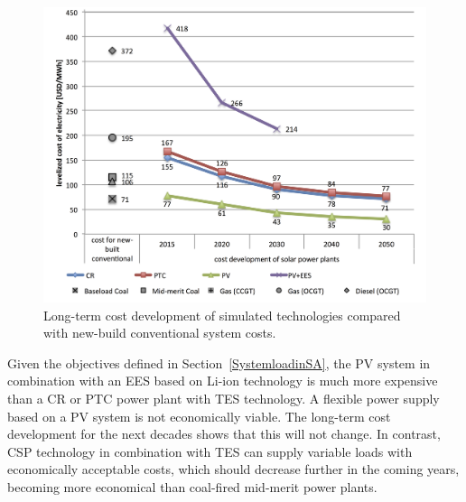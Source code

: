\begin{figure}[htbp]  
\centering
\includegraphics[width=1\linewidth]{FIG/Costdegrad}
\caption[Long-term cost development of simulated technologies compared with new-build conventional system costs.]{Long-term cost development of simulated technologies compared with new-build conventional system costs.}\label{Costdegrad}
\end{figure}


Given the objectives defined in Section~\ref{SystemloadinSA}, the PV system in combination with an EES based on Li-ion technology is much more expensive than a CR or PTC power plant with TES technology. A flexible power supply based on a PV system is not economically viable. The long-term cost development for the next decades shows that this will not change. In contrast, CSP technology in combination with TES can supply variable loads with economically acceptable costs, which should decrease further in the coming years, becoming more economical than coal-fired mid-merit power plants.